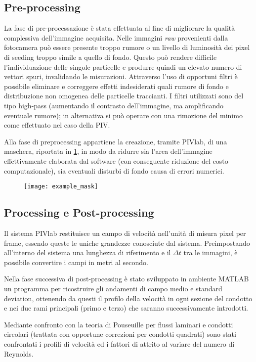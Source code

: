 \documentclass{article} %
\begin{document}
\subsection{Pre-processing}
La fase di pre-processazione è stata effettuata al fine di migliorare la qualità complessiva dell'immagine acquisita. Nelle immagini \textit{raw} provenienti dalla fotocamera può essere presente troppo rumore o un livello di luminosità dei pixel di seeding troppo simile a quello di fondo. Questo  può rendere difficile l'individuazione delle singole particelle e produrre quindi un elevato numero di vettori spuri, invalidando le misurazioni. Attraverso l'uso di opportuni filtri è possibile eliminare e correggere effetti indesiderati quali rumore di fondo e distribuzione non omogenea delle particelle traccianti. I filtri utilizzati sono del tipo high-pass (aumentando il contrasto dell'immagine, ma amplificando eventuale rumore); in alternativa si può operare con una rimozione del minimo come effettuato nel caso della PIV.\par
Alla fase di preprocessing appartiene la creazione, tramite PIVlab, di una maschera, riportata in \cref{fig:mask}, in modo da ridurre sia l'area dell'immagine effettivamente elaborata dal software (con conseguente riduzione del costo computazionale), sia eventuali disturbi di fondo causa di errori numerici.\par
\begin{figure}[h!]
	\centering
	\texttt{[image: example\_mask]}
	\caption{}
	\label{fig:mask}
\end{figure}
\subsection{Processing e Post-processing}
Il sistema PIVlab restituisce un campo di velocità nell'unità di misura pixel per frame, essendo queste le uniche grandezze conosciute dal sistema. Preimpostando all'interno del sistema una lunghezza di riferimento e il $\Delta t$ tra le immagini, è possibile convertire i campi in metri al secondo.\par
Nella fase successiva di post-processing è stato sviluppato in ambiente MATLAB un programma per ricostruire gli andamenti di campo medio e standard deviation, ottenendo da questi il profilo della velocità in ogni sezione del condotto e nei due rami principali (primo e terzo) che saranno successivamente introdotti.\par
Mediante confronto con la teoria di Pouseuille per flussi laminari e condotti circolari (trattata con opportune correzioni per condotti quadrati) sono stati confrontati i profili di velocità ed i fattori di attrito al variare del numero di Reynolds.\par
\end{document}
